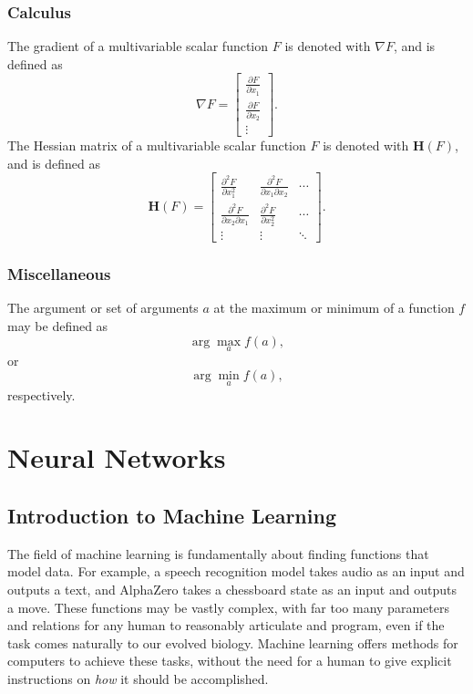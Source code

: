 \documentclass[12pt]{report}
\theoremstyle{definition}
\theoremstyle{remark}
\begin{document}
\subsection{Calculus}
The gradient of a multivariable scalar function $F$ is denoted with $\nabla F$, and is defined as
\begin{equation}
    \nabla F = \begin{bmatrix}
        \frac{\partial F}{\partial x_1} \\
        \frac{\partial F}{\partial x_2} \\
        \vdots
    \end{bmatrix}.
\end{equation}
The Hessian matrix of a multivariable scalar function $F$ is denoted with $\mathbf{H}(F)$, and is defined as
\begin{equation}
    \mathbf{H}(F) = \begin{bmatrix}
        \frac{\partial^2 F}{\partial x_1^2} & \frac{\partial^2 F}{\partial x_1 \partial x_2} & \cdots \\
        \frac{\partial^2 F}{\partial x_2 \partial x_1} & \frac{\partial^2 F}{\partial x_2^2} & \cdots \\
        \vdots & \vdots & \ddots
    \end{bmatrix}.
\end{equation}

\subsection{Miscellaneous}
The argument or set of arguments $a$ at the maximum or minimum of a function $f$ may be defined as
\begin{equation}
    \arg\max_a f(a),
\end{equation}
or
\begin{equation}
    \arg\min_a f(a),
\end{equation}
respectively.


\chapter{Neural Networks}
\section{Introduction to Machine Learning}
The field of machine learning is fundamentally about finding functions that model data. For example, a speech recognition model takes audio as an input and outputs a text, and AlphaZero takes a chessboard state as an input and outputs a move. These functions may be vastly complex, with far too many parameters and relations for any human to reasonably articulate and program, even if the task comes naturally to our evolved biology. Machine learning offers methods for computers to achieve these tasks, without the need for a human to give explicit instructions on \textit{how} it should be accomplished.
\end{document}
